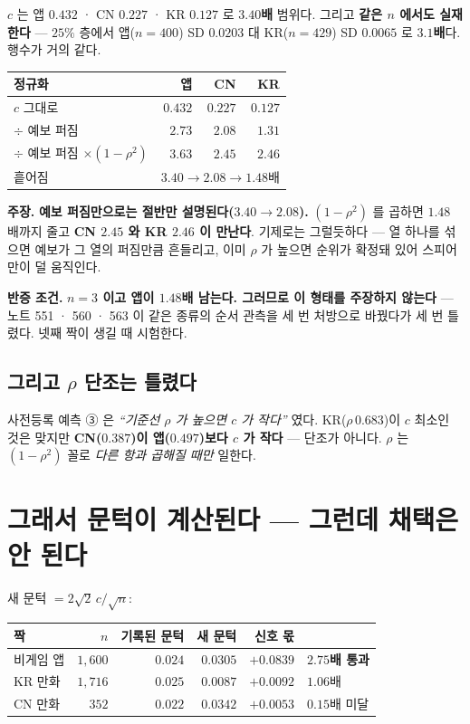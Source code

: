 \documentclass[10pt,a4paper]{article}
\newcommand{\claim}[2]{\begin{claimbox}\textbf{주장.} #1\par\smallskip
  \textcolor{gray!70}{\textbf{반증 조건.} #2}\end{claimbox}}
\begin{document}
$c$ 는 앱 $0.432$ · CN $0.227$ · KR $0.127$ 로 \textbf{$3.40$배} 범위다. 그리고
\textbf{같은 $n$ 에서도 실재한다} --- $25\%$ 층에서 앱($n=400$) SD $0.0203$ 대
KR($n=429$) SD $0.0065$ 로 \textbf{$3.1$배}다. 행수가 거의 같다.

\begin{center}
\begin{tabular}{lrrr}
\toprule
정규화 & 앱 & CN & KR \\
\midrule
$c$ 그대로 & $0.432$ & $0.227$ & $0.127$ \\
$\div$ 예보 퍼짐 & $2.73$ & $2.08$ & $1.31$ \\
$\div$ 예보 퍼짐 $\times (1-\rho^2)$ & $3.63$ & $\mathbf{2.45}$ & $\mathbf{2.46}$ \\
\midrule
흩어짐 & \multicolumn{3}{l}{$3.40 \to 2.08 \to \mathbf{1.48}$배} \\
\bottomrule
\end{tabular}
\end{center}

\claim{\textbf{예보 퍼짐만으로는 절반만 설명된다($3.40 \to 2.08$).} $(1-\rho^2)$ 를
곱하면 $1.48$ 배까지 줄고 \textbf{CN $2.45$ 와 KR $2.46$ 이 만난다}. 기제로는
그럴듯하다 --- 열 하나를 섞으면 예보가 그 열의 퍼짐만큼 흔들리고, 이미 $\rho$ 가
높으면 순위가 확정돼 있어 스피어만이 덜 움직인다.}
{\textbf{$n=3$ 이고 앱이 $1.48$배 남는다. 그러므로 이 형태를 주장하지 않는다} ---
노트 551 · 560 · 563 이 같은 종류의 순서 관측을 세 번 처방으로 바꿨다가 세 번
틀렸다. 넷째 짝이 생길 때 시험한다.}

\subsection*{그리고 $\rho$ 단조는 틀렸다}

사전등록 예측 ③ 은 \emph{``기준선 $\rho$ 가 높으면 $c$ 가 작다''} 였다. KR($\rho\,
0.683$)이 $c$ 최소인 것은 맞지만 \textbf{CN($0.387$)이 앱($0.497$)보다 $c$ 가
작다} --- 단조가 아니다. $\rho$ 는 $(1-\rho^2)$ 꼴로 \emph{다른 항과 곱해질 때만}
일한다.

\section{그래서 문턱이 계산된다 --- 그런데 채택은 안 된다}

새 문턱 $=2\sqrt{2}\,c/\sqrt{n}$:

\begin{center}
\begin{tabular}{lrrrrl}
\toprule
짝 & $n$ & 기록된 문턱 & \textbf{새 문턱} & 신호 몫 & \\
\midrule
비게임 앱 & $1{,}600$ & $0.024$ & $\mathbf{0.0305}$ & $+0.0839$ & \textbf{$2.75$배 통과} \\
KR 만화 & $1{,}716$ & $0.025$ & $\mathbf{0.0087}$ & $+0.0092$ & $1.06$배 \\
CN 만화 & $352$ & $0.022$ & $\mathbf{0.0342}$ & $+0.0053$ & $0.15$배 미달 \\
\bottomrule
\end{tabular}
\end{center}
\end{document}
